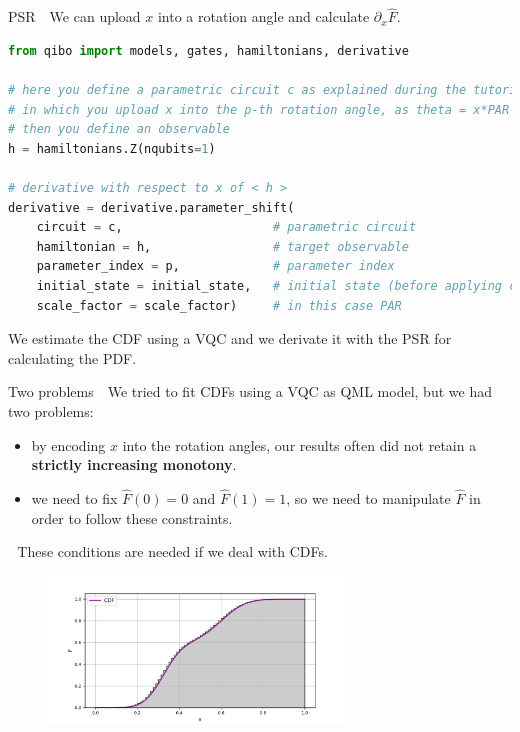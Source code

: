 \documentclass[8pt, xcolor={svgnames}, hyperref={colorlinks, linkcolor=black, citecolor=amethyst, urlcolor=amethyst}]{beamer}
\begin{document}
\begin{frame}[fragile]{PSR}
\large
\faArrowCircleRight\,\, We can upload $x$ into a rotation angle and calculate $\partial_x \hat{F}$.

\begin{tcolorbox}
\begin{lstlisting}[language=Python]
from qibo import models, gates, hamiltonians, derivative

# here you define a parametric circuit c as explained during the tutorials
# in which you upload x into the p-th rotation angle, as theta = x*PAR
# then you define an observable
h = hamiltonians.Z(nqubits=1)

# derivative with respect to x of < h >
derivative = derivative.parameter_shift(
    circuit = c,                     # parametric circuit
    hamiltonian = h,                 # target observable
    parameter_index = p,             # parameter index 
    initial_state = initial_state,   # initial state (before applying c)
    scale_factor = scale_factor)     # in this case PAR

\end{lstlisting}
\end{tcolorbox}
\pause
\vspace{0.3cm}
\begin{tcolorbox}[colback=amethyst!15, title=In a nutshell]
    We estimate the CDF using a VQC and we derivate it with the PSR for calculating the PDF.
\end{tcolorbox}
\end{frame}


\begin{frame}[fragile]{Two problems}
\large
\faArrowCircleRight\,\, We tried to fit CDFs using a VQC as QML model,
but we had two problems:
\begin{itemize}[noitemsep]
    \item[\faLineChart] by encoding $x$ into the rotation angles, 
    our results often did not retain a 
\textbf{strictly increasing monotony}.
    \item[\faChain] we need to fix $\hat{F}(0)=0$ and $\hat{F}(1)=1$, so we need
    to manipulate $\hat{F}$ in order to follow these constraints.
\end{itemize}

\faArrowCircleRight\,\, These conditions are needed if we deal with CDFs. 

\begin{figure}
    \includegraphics[width=0.7\textwidth]{figures/cdf.pdf}
\end{figure}

\end{frame}
\end{document}

